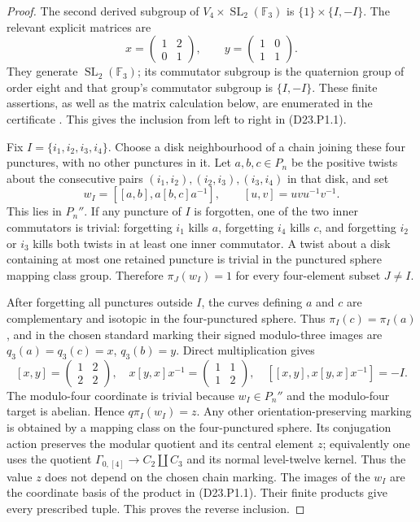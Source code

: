 \begin{proof}
The second derived subgroup of $V_4\times\operatorname{SL}_2(\mathbb F_3)$
is $\{1\}\times\{I,-I\}$. The relevant explicit matrices are
\[
 x=\begin{pmatrix}1&2\\0&1\end{pmatrix},\qquad
 y=\begin{pmatrix}1&0\\1&1\end{pmatrix}.
\]
They generate $\operatorname{SL}_2(\mathbb F_3)$; its commutator
subgroup is the quaternion group of order eight and that group's
commutator subgroup is $\{I,-I\}$. These finite assertions, as well
as the matrix calculation below, are enumerated in the certificate
.
This gives the inclusion from left to right in (D23.P1.1).

Fix $I=\{i_1,i_2,i_3,i_4\}$. Choose a disk neighbourhood of a
chain joining these four punctures, with no other punctures in it.
Let $a,b,c\in P_n$ be the positive twists about the consecutive
pairs $(i_1,i_2),(i_2,i_3),(i_3,i_4)$ in that disk, and set
\[
 w_I=[[a,b],a[b,c]a^{-1}],\qquad [u,v]=uvu^{-1}v^{-1}.
 \tag{D23.P1.2}
\]
This lies in $P_n''$. If any puncture of $I$ is forgotten, one of
the two inner commutators is trivial: forgetting $i_1$ kills $a$,
forgetting $i_4$ kills $c$, and forgetting $i_2$ or $i_3$ kills
both twists in at least one inner commutator. A twist about a disk
containing at most one retained puncture is trivial in the punctured
sphere mapping class group. Therefore $\pi_J(w_I)=1$ for every
four-element subset $J\ne I$.

After forgetting all punctures outside $I$, the curves defining $a$
and $c$ are complementary and isotopic in the four-punctured sphere.
Thus $\pi_I(c)=\pi_I(a)$, and in the chosen standard marking their
signed modulo-three images are $q_3(a)=q_3(c)=x$, $q_3(b)=y$.
Direct multiplication gives
\[
 [x,y]=\begin{pmatrix}1&2\\2&2\end{pmatrix},\quad
 x[y,x]x^{-1}=\begin{pmatrix}1&1\\1&2\end{pmatrix},\quad
 [[x,y],x[y,x]x^{-1}]=-I.
\]
The modulo-four coordinate is trivial because $w_I\in P_n''$ and
the modulo-four target is abelian. Hence $q\pi_I(w_I)=z$.
Any other orientation-preserving marking is obtained by a mapping
class on the four-punctured sphere. Its conjugation action preserves
the modular quotient and its central element $z$; equivalently one
uses the quotient $\Gamma_{0,[4]}\to C_2\amalg C_3$ and its normal
level-twelve kernel. Thus the value $z$ does not depend on the
chosen chain marking. The images of the $w_I$ are the coordinate
basis of the product in (D23.P1.1). Their finite products give every
prescribed tuple. This proves the reverse inclusion.
\end{proof}

